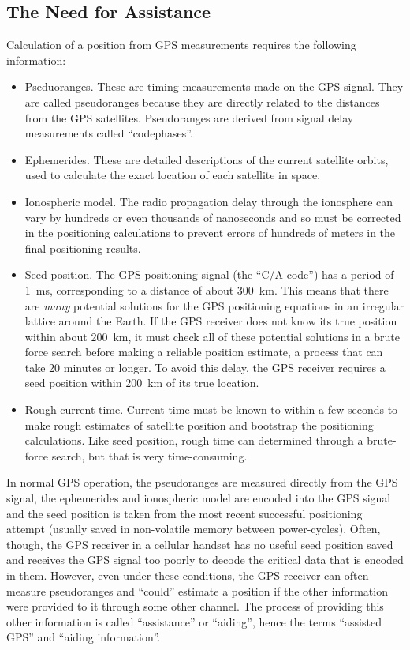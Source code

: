 \documentclass[11pt,openany]{book}
\begin{document}
\subsection{The Need for Assistance}
Calculation of a position from GPS measurements requires the following information:
\begin{itemize}
	\item Pseduoranges.  These are timing measurements made on the GPS signal.  They are called pseudoranges because they are directly related to the distances from the GPS satellites.  Pseudoranges are derived from signal delay measurements called ``codephases''.
	\item Ephemerides.  These are detailed descriptions of the current satellite orbits, used to calculate the exact location of each satellite in space.
	\item Ionospheric model.  The radio propagation delay through the ionosphere can vary by hundreds or even thousands of nanoseconds and so must be corrected in the positioning calculations to prevent errors of hundreds of meters in the final positioning results.
	\item Seed position.  The GPS positioning signal (the ``C/A code'') has a period of 1~ms, corresponding to a distance of about 300~km.  This means that there are \emph{many} potential solutions for the GPS positioning equations in an irregular lattice around the Earth.  If the GPS receiver does not know its true position within about 200~km, it must check all of these potential solutions in a brute force search before making a reliable position estimate, a process that can take 20 minutes or longer.  To avoid this delay, the GPS receiver requires a seed position within 200~km of its true location.
	\item Rough current time. Current time must be known to within a few seconds to make rough estimates of satellite position and bootstrap the positioning calculations.  Like seed position, rough time can determined through a brute-force search, but that is very time-consuming.
\end{itemize}
In normal GPS operation, the pseudoranges are measured directly from the GPS signal, the ephemerides and ionospheric model are encoded into the GPS signal and the seed position is taken from the most recent successful positioning attempt (usually saved in non-volatile memory between power-cycles).
Often, though, the GPS receiver in a cellular handset has no useful seed position saved and receives the GPS signal too poorly to decode the critical data that is encoded in them.  However, even under these conditions, the GPS receiver can often measure pseudoranges and ``could'' estimate a position if the other information were provided to it through some other channel.  The process of providing this other information is called ``assistance'' or ``aiding'', hence the terms ``assisted GPS'' and ``aiding information''.
\end{document}
